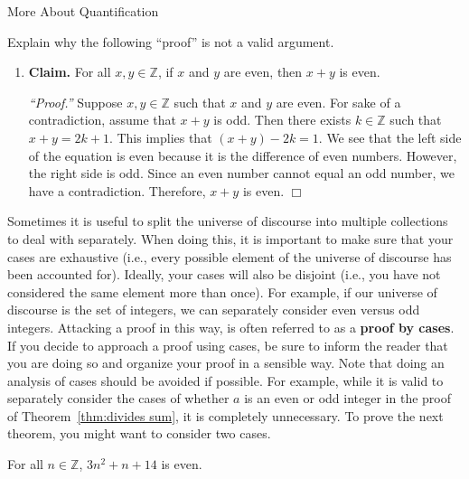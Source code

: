 \begin{section}{More About Quantification}
\begin{problem}
Explain why the following ``proof'' is not a valid argument.
\begin{enumerate}
\item[] \textbf{Claim.}  For all $x,y\in \mathbb{Z}$, if $x$ and $y$ are even, then $x+y$ is even.

\bigskip

\emph{``Proof.''}  Suppose $x, y \in \mathbb{Z}$ such that $x$ and $y$ are even.  For sake of a contradiction, assume that $x+y$ is odd.  Then there exists $k \in \mathbb{Z}$ such that $x+y=2k+1$.  This implies that $(x+y)-2k=1$.  We see that the left side of the equation is even because it is the difference of even numbers.  However, the right side is odd.  Since an even number cannot equal an odd number, we have a contradiction.  Therefore, $x+y$ is even.  \hfill $\Box$
\end{enumerate}

\end{problem}

Sometimes it is useful to split the universe of discourse into multiple collections to deal with separately.  When doing this, it is important to make sure that your cases are exhaustive (i.e., every possible element of the universe of discourse has been accounted for).  Ideally, your cases will also be disjoint (i.e., you have not considered the same element more than once).  For example, if our universe of discourse is the set of integers, we can separately consider even versus odd integers. Attacking a proof in this way, is often referred to as a \textbf{proof by cases}. If you decide to approach a proof using cases, be sure to inform the reader that you are doing so and organize your proof in a sensible way. Note that doing an analysis of cases should be avoided if possible. For example, while it is valid to separately consider the cases of whether $a$ is an even or odd integer in the proof of Theorem~\ref{thm:divides sum}, it is completely unnecessary.  To prove the next theorem, you might want to consider two cases.

\begin{theorem}
For all $n\in \mathbb{Z}$, $3n^2+n+14$ is even.
\end{theorem}


\end{section}
